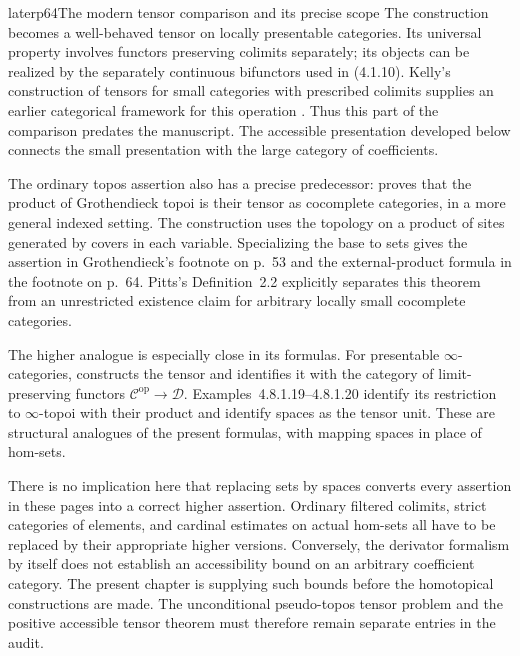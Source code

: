 \begin{dcomment}{later}{p64}{The modern tensor comparison and its precise scope}
The construction becomes a well-behaved tensor on locally presentable categories. Its universal property involves functors preserving colimits separately; its objects can be realized by the separately continuous bifunctors used in (4.1.10). Kelly's construction of tensors for small categories with prescribed colimits supplies an earlier categorical framework for this operation \citep[Section~6.5, equation~(6.24)]{Kelly1982}. Thus this part of the comparison predates the manuscript. The accessible presentation developed below connects the small presentation with the large category of coefficients.

The ordinary topos assertion also has a precise predecessor: \citet[Theorem~2.3, pp.~50--52]{Pitts1985} proves that the product of Grothendieck topoi is their tensor as cocomplete categories, in a more general indexed setting. The construction uses the topology on a product of sites generated by covers in each variable. Specializing the base to sets gives the assertion in Grothendieck's footnote on p.~53 and the external-product formula in the footnote on p.~64. Pitts's Definition~2.2 explicitly separates this theorem from an unrestricted existence claim for arbitrary locally small cocomplete categories.

The higher analogue is especially close in its formulas. For presentable $\infty$-categories, \citet[Proposition~4.8.1.15, Lemma~4.8.1.16, and Proposition~4.8.1.17]{Lurie2017HA} constructs the tensor and identifies it with the category of limit-preserving functors $\mathcal C^{\mathrm{op}}\to\mathcal D$. Examples~4.8.1.19--4.8.1.20 identify its restriction to $\infty$-topoi with their product and identify spaces as the tensor unit. These are structural analogues of the present formulas, with mapping spaces in place of hom-sets.

There is no implication here that replacing sets by spaces converts every assertion in these pages into a correct higher assertion. Ordinary filtered colimits, strict categories of elements, and cardinal estimates on actual hom-sets all have to be replaced by their appropriate higher versions. Conversely, the derivator formalism by itself does not establish an accessibility bound on an arbitrary coefficient category. The present chapter is supplying such bounds before the homotopical constructions are made. The unconditional pseudo-topos tensor problem and the positive accessible tensor theorem must therefore remain separate entries in the audit.
\end{dcomment}



